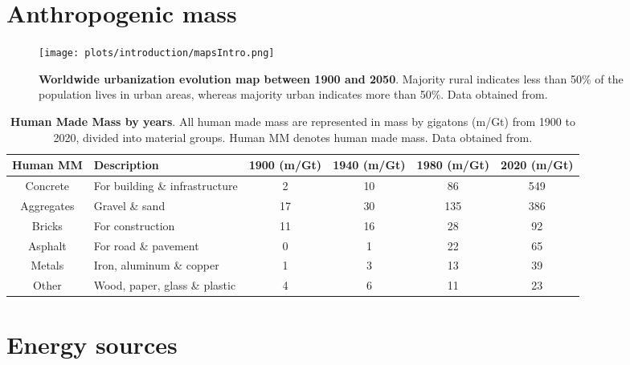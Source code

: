 \section[Anthropogenic mass]{Anthropogenic mass}
\label{sec:anthropogenic_mass}

\begin{figure}[ht!]
  \centering
  \texttt{[image: plots/introduction/mapsIntro.png]}
  \caption[Worldwide urbanization evolution map between 1900 and 2050]{\textbf{Worldwide urbanization evolution map between 1900 and 2050}. Majority rural indicates less than 50\% of the population lives in urban areas, whereas majority urban indicates more than 50\%. Data obtained from.\autocite{ourworldindata_2020}}
  \label{fig:ghg}
\end{figure}




\begin{table}[!htb]
  \caption[Human Made Mass by years]{\textbf{Human Made Mass by years}. All human made mass are represented in mass by gigatons (m/Gt) from 1900 to 2020, divided into material groups. Human MM denotes human made mass. Data obtained from.\autocite{krausmann2017global}}
  \begin{scriptsize}
    \begin{tabulary}{0.65\linewidth}{clcccc}
      \textbf{Human MM} & \textbf{Description} & \textbf{1900 (m/Gt)} & \textbf{1940 (m/Gt)} & \textbf{1980 (m/Gt)} & \textbf{2020 (m/Gt)} \\ \hline
      Concrete & For building \& infrastructure & 2 & 10 & 86 & 549  \\
      Aggregates & Gravel \& sand & 17 & 30 & 135 & 386  \\
      Bricks & For construction & 11 & 16 & 28 & 92  \\
      Asphalt & For road \& pavement & 0 & 1 & 22 & 65  \\
      Metals & Iron, aluminum \& copper & 1 & 3 & 13 & 39  \\
      Other & Wood, paper, glass \& plastic & 4 & 6 & 11 & 23  \\
    \end{tabulary}
  \end{scriptsize}
  \label{tab:hmm_table}
\end{table}

\section[Energy sources]{Energy sources}
\label{sec:energy_sources}


